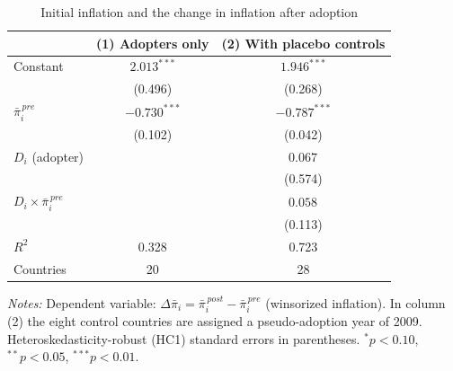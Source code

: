 \begin{table}[htbp]\centering\small
\caption{Initial inflation and the change in inflation after adoption}\label{tab:cross}
\begin{tabular}{lcc}
\toprule
 & (1) Adopters only & (2) With placebo controls \\
\midrule
Constant & $2.013^{***}$ & $1.946^{***}$ \\
 & (0.496) & (0.268) \\
$\bar{\pi}_i^{\,pre}$ & $-0.730^{***}$ & $-0.787^{***}$ \\
 & (0.102) & (0.042) \\
$D_i$ (adopter) &  & $0.067^{}$ \\
 &  & (0.574) \\
$D_i \times \bar{\pi}_i^{\,pre}$ &  & $0.058^{}$ \\
 &  & (0.113) \\
\midrule
$R^2$ & 0.328 & 0.723 \\
Countries & 20 & 28 \\
\bottomrule
\end{tabular}
\begin{minipage}{0.9\linewidth}\vspace{4pt}\footnotesize\textit{Notes:} Dependent variable: $\Delta\bar{\pi}_i = \bar{\pi}_i^{\,post} - \bar{\pi}_i^{\,pre}$ (winsorized inflation). In column (2) the eight control countries are assigned a pseudo-adoption year of 2009. Heteroskedasticity-robust (HC1) standard errors in parentheses. $^{*}p<0.10$, $^{**}p<0.05$, $^{***}p<0.01$.\end{minipage}
\end{table}